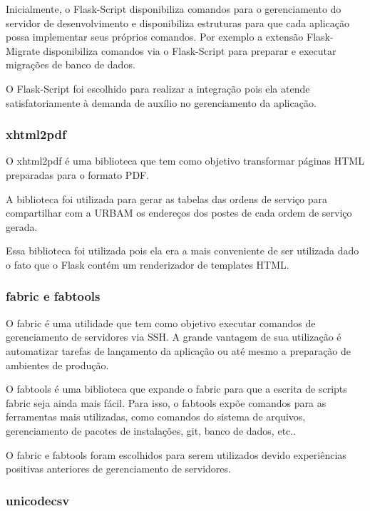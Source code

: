 \documentclass[
	article,			%
	11pt,				%
	oneside,			%
	a4paper,			%
	english,			%
	brazil,				%
	sumario=tradicional
	]{abntex2}
\begin{document}
Inicialmente, o Flask-Script disponibiliza comandos para o gerenciamento do servidor de desenvolvimento e disponibiliza estruturas para que cada aplicação possa implementar seus próprios comandos. \cite{flaskscript}
Por exemplo a extensão Flask-Migrate disponibiliza comandos via o Flask-Script para preparar e executar migrações de banco de dados.

O Flask-Script foi escolhido para realizar a integração pois ela atende satisfatoriamente à demanda de auxílio no gerenciamento da aplicação.

\subsubsection{xhtml2pdf}

O xhtml2pdf é uma biblioteca que tem como objetivo transformar páginas HTML preparadas para o formato PDF.\cite{xhtml2pdf}

A biblioteca foi utilizada para gerar as tabelas das ordens de serviço para compartilhar com a URBAM os endereços dos postes de cada ordem de serviço gerada.

Essa biblioteca foi utilizada pois ela era a mais conveniente de ser utilizada dado o fato que o Flask contém um renderizador de templates HTML.

\subsubsection{fabric e fabtools}

O fabric é uma utilidade que tem como objetivo executar comandos de gerenciamento de servidores via SSH.
A grande vantagem de sua utilização é automatizar tarefas de lançamento da aplicação ou até mesmo a preparação de ambientes de produção.\cite{fabric}

O fabtools é uma biblioteca que expande o fabric para que a escrita de scripts fabric seja ainda mais fácil.
Para isso, o fabtools expõe comandos para as ferramentas mais utilizadas, como comandos do sistema de arquivos, gerenciamento de pacotes de instalações, git, banco de dados, etc.. \cite{fabtools}

O fabric e fabtools foram escolhidos para serem utilizados devido experiências positivas anteriores de gerenciamento de servidores.

\subsubsection{unicodecsv}
\end{document}
